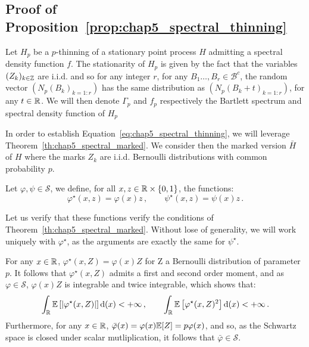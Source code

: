 \begin{subappendices}
    \section{Proof of Proposition~\ref{prop:chap5_spectral_thinning}}\label{appendix:chap5_proof_spectral_thinning}
        Let $H_p$ be a $p$-thinning of a stationary point process $H$ admitting a spectral density function $f$.
        The stationarity of $H_p$ is given by the fact that the variables $(Z_k)_{k\in{\mathbb Z}}$ are i.i.d. and so for any integer $r$, 
        for any $B_1\ldots, B_r \in\mathcal{B}^c$, 
        the random vector $(N_p(B_k)_{k=1:r})$ has the same distribution as $(N_p(B_k+t)_{k=1:r})$,
        for any $t\in{\mathbb R}$.
        We will then denote $\Gamma_p$ and $f_p$ respectively the Bartlett spectrum and spectral density function of $H_p$

        In order to establish Equation~\eqref{eq:chap5_spectral_thinning}, we will leverage Theorem~\ref{th:chap5_spectral_marked}.
        We consider then the marked version $\bar H$ of $H$ where the marks $Z_k$ are i.i.d. Bernoulli distributions with common probability $p$.

        Let $\varphi, \psi \in \mathcal{S}$, we define, for all $x,z\in{\mathbb R}\times\{0,1\}$, the functions:
        \[\varphi^\star(x,z) = \varphi(x)z\,,\qquad \psi^\star(x,z) = \psi(x)z\,.\]

        Let us verify that these functions verify the conditions of Theorem~\ref{th:chap5_spectral_marked}. 
        Without lose of generality, we will work uniquely with $\varphi^\star$, as the arguments are exactly the same for $\psi^\star$.
        
        For any $x\in{\mathbb R}$, $\varphi^\star(x, Z) = \varphi(x)Z$ for Z a Bernoulli distribution of parameter $p$.
        It follows that $\varphi^\star(x, Z)$ admits a first and second order moment, and as $\varphi\in\mathcal{S}$, 
        $\varphi(x)Z$ is integrable and twice integrable, which shows that:
                \[
                \int_{{\mathbb R}}{{\mathbb E}\left[|\varphi^\star(x, Z)|\right]{\mathrm{d}}(x)} < +\infty\,,\qquad 
                \int_{{\mathbb R}}{{\mathbb E}\left[\varphi^\star(x, Z)^2\right]{\mathrm{d}}(x)} < +\infty\,.
                \]
        Furthermore, for any $x\in{\mathbb R}$, $\bar \varphi(x) = \varphi(x){\mathbb E}[Z] = p \varphi(x)$,
        and so, as the Schwartz space is closed under scalar mutliplication, it follows that $\bar \varphi\in\mathcal{S}$.


\end{subappendices}
